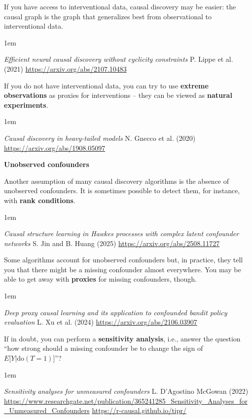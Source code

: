 \documentclass[a5paper]{article}
\let\d\textbf
\newenvironment{reference}{%
  \medskip\goodbreak
  \parskip 0pt
  \raggedright
  \leftskip 1em
  \obeylines
}{\par\medskip\goodbreak}
\def\subsection#1{{\par\bigskip\goodbreak\large\bfseries #1\par}}
\begin{document}
If you have access to interventional data,
causal discovery may be easier:
the causal graph is the graph that generalizes best from observational to interventional data.

\begin{reference}
  \emph{Efficient neural causal discovery  without cyclicity constraints}
  P. Lippe et al. (2021)
  \url{https://arxiv.org/abs/2107.10483}
\end{reference}

If you do not have interventional data,
you can try to use \d{extreme observations} as proxies for interventions --
they can be viewed as \d{natural experiments}.

\begin{reference}
  \emph{Causal discovery in heavy-tailed models}
  N. Gnecco et al. (2020)
  \url{https://arxiv.org/abs/1908.05097}
\end{reference}

\subsection{Unobserved confounders}

Another assumption of many causal discovery algorithms
is the absence of unobserved confounders.
It is sometimes possible to detect them,
for instance, with \d{rank conditions}.

\begin{reference}
  \emph{Causal structure learning in Hawkes processes with complex latent confounder networks}
  S. Jin and B. Huang (2025)
  \url{https://arxiv.org/abs/2508.11727}
\end{reference}

Some algorithms account for unobserved confounders but, in practice,
they tell you that there might be a missing confounder
almost everywhere.
You may be able to get away with \d{proxies} for missing confounders, though.

\begin{reference}
  \emph{Deep proxy causal learning and its application to confounded bandit policy evaluation}
  L. Xu et al. (2024)
  \url{https://arxiv.org/abs/2106.03907}
\end{reference}

If in doubt, you can perform a \d{sensitivity analysis}, i.e.,
answer the question
``how strong should a missing confounder be to change the sign of
$E\bigl[Y|\text{do}(T=1)\bigr]$''?

\begin{reference}
  \emph{Sensitivity analyses  for unmeasured confounders}
  L. D'Agostino McGowan (2022)
  \url{https://www.researchgate.net/publication/365241285_Sensitivity_Analyses_for_Unmeasured_Confounders}
  \url{https://r-causal.github.io/tipr/}
\end{reference}
\end{document}
